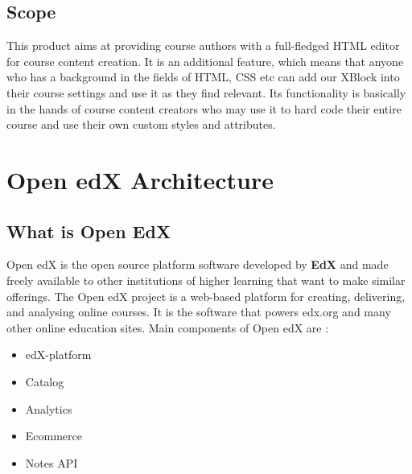 \section{Scope}
This product aims at providing course authors with a full-fledged HTML editor for course content
creation. It is an additional feature, which means that anyone who has a background in the fields of
HTML, CSS etc can add our XBlock into their course settings and use it as they find relevant. Its
functionality is basically in the hands of course content creators who may use it to hard code their
entire course and use their own custom styles and attributes.



\chapter{Open edX Architecture}

\section{What is Open EdX}

Open edX is the open source platform software developed by \textbf{EdX} and made freely available to
other institutions of higher learning that want to make similar offerings. The Open edX project is a
web-based platform for creating, delivering, and analysing online courses. It is the software that
powers edx.org and many other online education sites.\newline\newline
Main components of Open edX are : \newline
\begin{itemize}
	\item edX-platform
	\item Catalog
	\item Analytics
	\item Ecommerce
	\item Notes API
\end{itemize}

